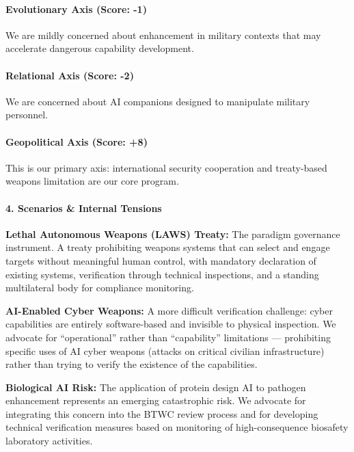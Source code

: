 \paragraph{Evolutionary Axis (Score:
-1)}\label{evolutionary-axis-score--1-2}

We are mildly concerned about enhancement in military contexts that may
accelerate dangerous capability development.

\paragraph{Relational Axis (Score:
-2)}\label{relational-axis-score--2-3}

We are concerned about AI companions designed to manipulate military
personnel.

\paragraph{Geopolitical Axis (Score:
+8)}\label{geopolitical-axis-score-8}

This is our primary axis: international security cooperation and
treaty-based weapons limitation are our core program.

\paragraph{4. Scenarios \& Internal
Tensions}\label{scenarios-internal-tensions-25}

\textbf{Lethal Autonomous Weapons (LAWS) Treaty:} The paradigm
governance instrument. A treaty prohibiting weapons systems that can
select and engage targets without meaningful human control, with
mandatory declaration of existing systems, verification through
technical inspections, and a standing multilateral body for compliance
monitoring.

\textbf{AI-Enabled Cyber Weapons:} A more difficult verification
challenge: cyber capabilities are entirely software-based and invisible
to physical inspection. We advocate for ``operational'' rather than
``capability'' limitations --- prohibiting specific uses of AI cyber
weapons (attacks on critical civilian infrastructure) rather than trying
to verify the existence of the capabilities.

\textbf{Biological AI Risk:} The application of protein design AI to
pathogen enhancement represents an emerging catastrophic risk. We
advocate for integrating this concern into the BTWC review process and
for developing technical verification measures based on monitoring of
high-consequence biosafety laboratory activities.

